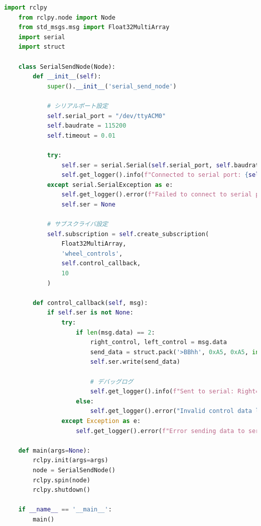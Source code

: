 \begin{lstlisting}[language=Python, caption=serial\_send\_node.py]
    import rclpy
    from rclpy.node import Node
    from std_msgs.msg import Float32MultiArray
    import serial
    import struct
    
    class SerialSendNode(Node):
        def __init__(self):
            super().__init__('serial_send_node')
    
            # シリアルポート設定
            self.serial_port = "/dev/ttyACM0"
            self.baudrate = 115200
            self.timeout = 0.01
    
            try:
                self.ser = serial.Serial(self.serial_port, self.baudrate, timeout=self.timeout)
                self.get_logger().info(f"Connected to serial port: {self.serial_port}")
            except serial.SerialException as e:
                self.get_logger().error(f"Failed to connect to serial port: {e}")
                self.ser = None
    
            # サブスクライバ設定
            self.subscription = self.create_subscription(
                Float32MultiArray,
                'wheel_controls',
                self.control_callback,
                10
            )
    
        def control_callback(self, msg):
            if self.ser is not None:
                try:
                    if len(msg.data) == 2:
                        right_control, left_control = msg.data
                        send_data = struct.pack('>BBhh', 0xA5, 0xA5, int(right_control), int(left_control))
                        self.ser.write(send_data)
    
                        # デバッグログ
                        self.get_logger().info(f"Sent to serial: Right={right_control}, Left={left_control}")
                    else:
                        self.get_logger().error("Invalid control data length. Expected 2 values.")
                except Exception as e:
                    self.get_logger().error(f"Error sending data to serial: {e}")
    
    def main(args=None):
        rclpy.init(args=args)
        node = SerialSendNode()
        rclpy.spin(node)
        rclpy.shutdown()
    
    if __name__ == '__main__':
        main()
\end{lstlisting}

